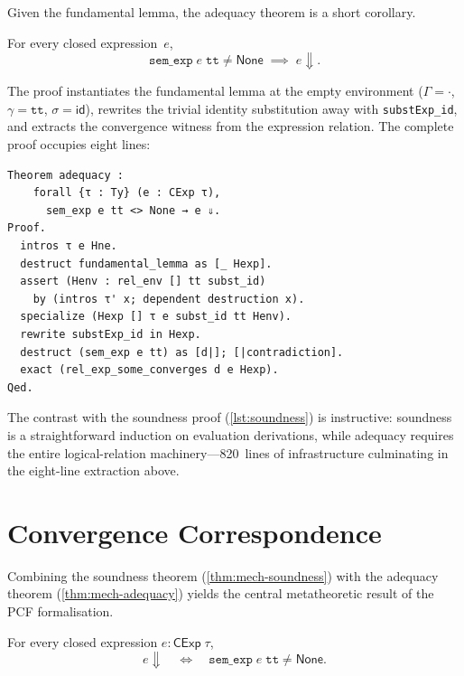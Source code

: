 Given the fundamental lemma, the adequacy theorem is a short
corollary.

\begin{theorem}
\label{thm:mech-adequacy}
For every closed expression~$e$,
\[
  \texttt{sem\_exp}\;e\;\mathtt{tt} \neq \mathsf{None}
  \;\implies\;  e \Downarrow.
\]
\end{theorem}

\noindent
The proof instantiates the fundamental lemma at the empty environment
($\Gamma = \cdot$, $\gamma = \mathtt{tt}$, $\sigma = \mathsf{id}$),
rewrites the trivial identity substitution away with
\texttt{substExp\_id}, and extracts the convergence witness from the
expression relation.  The complete proof occupies eight lines:

\begin{lstlisting}[caption={Adequacy theorem (\texttt{PCF\_Adequacy.v}).},
                    label={lst:adequacy}]
Theorem adequacy :
    forall {τ : Ty} (e : CExp τ),
      sem_exp e tt <> None → e ⇓.
Proof.
  intros τ e Hne.
  destruct fundamental_lemma as [_ Hexp].
  assert (Henv : rel_env [] tt subst_id)
    by (intros τ' x; dependent destruction x).
  specialize (Hexp [] τ e subst_id tt Henv).
  rewrite substExp_id in Hexp.
  destruct (sem_exp e tt) as [d|]; [|contradiction].
  exact (rel_exp_some_converges d e Hexp).
Qed.
\end{lstlisting}

\noindent
The contrast with the soundness proof (\cref{lst:soundness}) is
instructive: soundness is a straightforward induction on evaluation
derivations, while adequacy requires the entire logical-relation
machinery---820~lines of infrastructure culminating in the eight-line
extraction above.

\section{Convergence Correspondence}
\label{sec:res-correspondence}

Combining the soundness theorem (\cref{thm:mech-soundness}) with the
adequacy theorem (\cref{thm:mech-adequacy}) yields the central
metatheoretic result of the PCF formalisation.

\begin{theorem}
\label{thm:mech-convergence}
For every closed expression $e : \mathsf{CExp}\;\tau$,
\[
  e \Downarrow
  \quad\iff\quad
  \texttt{sem\_exp}\;e\;\mathtt{tt} \neq \mathsf{None}.
\]
\end{theorem}

